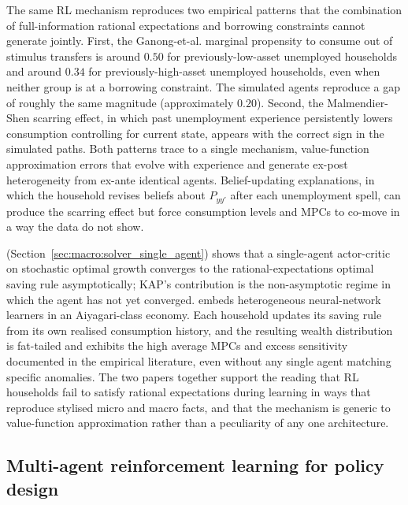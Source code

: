 The same RL mechanism reproduces two empirical patterns that the
combination of full-information rational expectations and
borrowing constraints cannot generate jointly. First, the
Ganong-et-al. marginal propensity to consume out of stimulus
transfers is around $0.50$ for previously-low-asset unemployed
households and around $0.34$ for previously-high-asset unemployed
households, even when neither group is at a borrowing constraint.
The simulated agents reproduce a gap of roughly the same magnitude
(approximately $0.20$). Second, the Malmendier-Shen scarring effect,
in which past unemployment experience persistently lowers consumption
controlling for current state, appears with the correct sign in the
simulated paths. Both patterns trace to a single
mechanism, value-function approximation errors that evolve with
experience and generate ex-post heterogeneity from ex-ante identical
agents. Belief-updating explanations, in which the household revises
beliefs about $P_{yy'}$ after each unemployment spell, can produce
the scarring effect but force consumption levels and MPCs to co-move
in a way the data do not show.

\citet{Shi2022consumption} (Section~\ref{sec:macro:solver_single_agent})
shows that a single-agent actor-critic on stochastic optimal growth
converges to the rational-expectations optimal saving rule
asymptotically; KAP's contribution is the non-asymptotic regime in
which the agent has not yet converged. \citet{Kuriksha2021} embeds heterogeneous
neural-network learners in an Aiyagari-class economy. Each household
updates its saving rule from its own realised consumption history,
and the resulting wealth distribution is fat-tailed and exhibits the
high average MPCs and excess sensitivity documented in the empirical
literature, even without any single agent matching specific anomalies.
The two papers together support the reading that RL households fail
to satisfy rational expectations during learning in ways that
reproduce stylised micro and macro facts, and that the mechanism is
generic to value-function approximation rather than a peculiarity of
any one architecture.

\subsection{Multi-agent reinforcement learning for policy design}
\label{sec:macro:policy_marl}
\label{sec:macro:policy}

